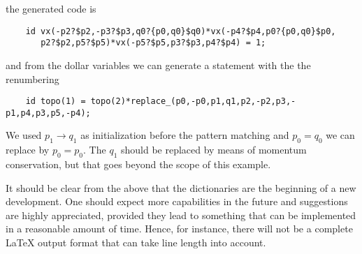 the generated code is
\begin{verbatim}
    id vx(-p2?$p2,-p3?$p3,q0?{p0,q0}$q0)*vx(-p4?$p4,p0?{p0,q0}$p0,
       p2?$p2,p5?$p5)*vx(-p5?$p5,p3?$p3,p4?$p4) = 1;
\end{verbatim}
and from the dollar variables we can generate a statement with the the 
renumbering
\begin{verbatim}
    id topo(1) = topo(2)*replace_(p0,-p0,p1,q1,p2,-p2,p3,-p1,p4,p3,p5,-p4);
\end{verbatim}
We used $p_1\rightarrow q_1$ as initialization before the pattern matching 
and $p_0 = q_0$ we can replace by $p_0 = p_0$. The $q_1$ should be replaced 
by means of momentum conservation, but that goes beyond the scope of this 
example.

It should be clear from the above that the dictionaries are the beginning 
of a new development. One should expect more capabilities in the future and 
suggestions are highly appreciated, provided they lead to something that 
can be implemented in a reasonable amount of time. Hence, for instance, 
there will not be a complete \LaTeX{} output format that can take line length 
into account.
